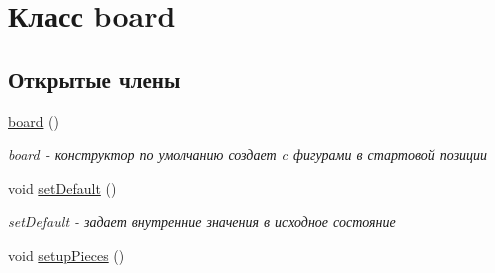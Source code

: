 \hypertarget{classboard}{}\section{Класс board}
\label{classboard}
\subsection*{Открытые члены}
\begin{DoxyCompactItemize}
\item 
\hypertarget{classboard_a2a97f34e7c9ed8ace6a2508bb2c6e2a2}{}\hyperlink{classboard_a2a97f34e7c9ed8ace6a2508bb2c6e2a2}{board} ()\label{classboard_a2a97f34e7c9ed8ace6a2508bb2c6e2a2}

\begin{DoxyCompactList}\small\item\em board -\/ конструктор по умолчанию создает c фигурами в стартовой позиции \end{DoxyCompactList}\item 
\hypertarget{classboard_a02fbb0cbb90dd7ab753f52c17700efbe}{}void \hyperlink{classboard_a02fbb0cbb90dd7ab753f52c17700efbe}{set\+Default} ()\label{classboard_a02fbb0cbb90dd7ab753f52c17700efbe}

\begin{DoxyCompactList}\small\item\em set\+Default -\/ задает внутренние значения в исходное состояние \end{DoxyCompactList}\item 
\hypertarget{classboard_ae7c2a8d249f08c8c87d222e55cfd990c}{}void \hyperlink{classboard_ae7c2a8d249f08c8c87d222e55cfd990c}{setup\+Pieces} ()\label{classboard_ae7c2a8d249f08c8c87d222e55cfd990c}


\end{DoxyCompactItemize}
